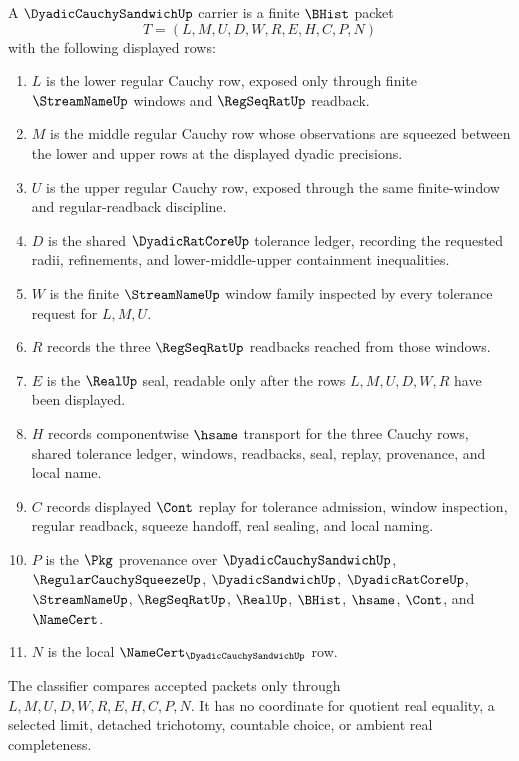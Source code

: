 \begin{definition}
\label{def:dyadic-cauchy-sandwich-carrier}
A $\DyadicCauchySandwichUp$ carrier is a finite $\BHist$ packet
$$
T=(L,M,U,D,W,R,E,H,C,P,N)
$$
with the following displayed rows:
\begin{enumerate}
\item $L$ is the lower regular Cauchy row, exposed only through finite $\StreamNameUp$ windows and $\RegSeqRatUp$ readback.
\item $M$ is the middle regular Cauchy row whose observations are squeezed between the lower and upper rows at the displayed dyadic precisions.
\item $U$ is the upper regular Cauchy row, exposed through the same finite-window and regular-readback discipline.
\item $D$ is the shared $\DyadicRatCoreUp$ tolerance ledger, recording the requested radii, refinements, and lower-middle-upper containment inequalities.
\item $W$ is the finite $\StreamNameUp$ window family inspected by every tolerance request for $L,M,U$.
\item $R$ records the three $\RegSeqRatUp$ readbacks reached from those windows.
\item $E$ is the $\RealUp$ seal, readable only after the rows $L,M,U,D,W,R$ have been displayed.
\item $H$ records componentwise $\hsame$ transport for the three Cauchy rows, shared tolerance ledger, windows, readbacks, seal, replay, provenance, and local name.
\item $C$ records displayed $\Cont$ replay for tolerance admission, window inspection, regular readback, squeeze handoff, real sealing, and local naming.
\item $P$ is the $\Pkg$ provenance over $\DyadicCauchySandwichUp$, $\RegularCauchySqueezeUp$, $\DyadicSandwichUp$, $\DyadicRatCoreUp$, $\StreamNameUp$, $\RegSeqRatUp$, $\RealUp$, $\BHist$, $\hsame$, $\Cont$, and $\NameCert$.
\item $N$ is the local $\NameCert_{\DyadicCauchySandwichUp}$ row.
\end{enumerate}
The classifier compares accepted packets only through $L,M,U,D,W,R,E,H,C,P,N$. It has no coordinate for quotient real equality, a selected limit, detached trichotomy, countable choice, or ambient real completeness.
\end{definition}

